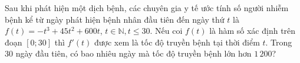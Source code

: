\begin{ex}%
	Sau khi phát hiện một dịch bệnh, các chuyên gia y tế ước tính số người nhiễm bệnh kể từ ngày phát hiện bệnh nhân đầu tiên đến ngày thứ $t$ là $f(t)=-t^3+45t^2+600t$, $t\in \mathbb{N},t\leq 30$. Nếu coi $f(t)$ là hàm số xác định trên đoạn $[0;30]$ thì $f'(t)$ được xem là tốc độ truyền bệnh tại thời điểm $t$. Trong 30 ngày đầu tiên, có bao nhiêu ngày mà tốc độ truyền bệnh lớn hơn $1\,200$?
\end{ex}

